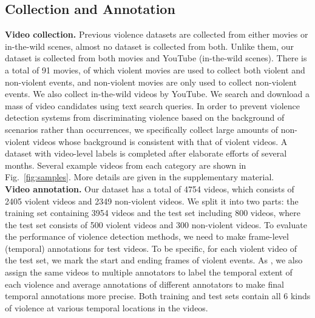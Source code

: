 \documentclass[runningheads]{llncs}
\begin{document}
\subsection{Collection and Annotation}
\textbf{Video collection.} Previous violence datasets are collected from either movies or in-the-wild scenes, almost no dataset is collected from both. Unlike them, our dataset is collected from both movies and YouTube (in-the-wild scenes). There is a total of 91 movies, of which violent movies are used to collect both violent and non-violent events, and non-violent movies are only used to collect non-violent events. We also collect in-the-wild videos by YouTube. We search and download a mass of video candidates using text search queries. In order to prevent violence detection systems from discriminating violence based on the background of scenarios rather than occurrences, we specifically collect large amounts of non-violent videos whose background is consistent with that of violent videos. A dataset with video-level labels is completed after elaborate efforts of several months. Several example videos from each category are shown in Fig.~\ref{fig:samples}. More details are given in the supplementary material.\\
\noindent\textbf{Video annotation.} Our dataset has a total of 4754 videos, which consists of 2405 violent videos and 2349 non-violent videos. We split it into two parts: the training set containing 3954 videos and the test set including 800 videos, where the test set consists of 500 violent videos and 300 non-violent videos. To evaluate the performance of violence detection methods, we need to make frame-level (temporal) annotations for test videos. To be specific, for each violent video of the test set, we mark the start and ending frames of violent events. As \cite{sultani2018real}, we also assign the same videos to multiple annotators to label the temporal extent of each violence and average annotations of different annotators to make final temporal annotations more precise. Both training and test sets contain all 6 kinds of violence at various temporal locations in the videos.
\end{document}
